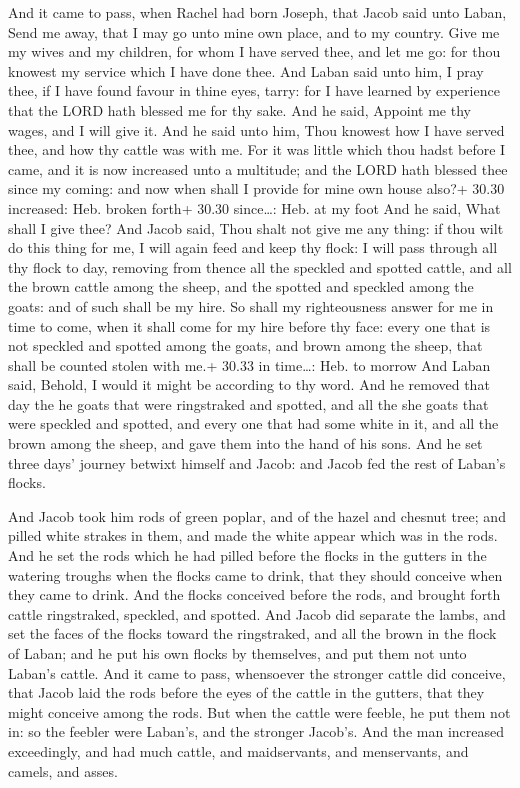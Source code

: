  And it came to pass, when Rachel had born Joseph, that
Jacob said unto Laban, Send me away, that I may go unto mine own place,
and to my country.  Give me my wives and my children, for
whom I have served thee, and let me go: for thou knowest my service
which I have done thee.  And Laban said unto him, I pray
thee, if I have found favour in thine eyes, tarry: for I have learned by
experience that the LORD hath blessed me for thy sake.  And
he said, Appoint me thy wages, and I will give it.  And he
said unto him, Thou knowest how I have served thee, and how thy cattle
was with me.  For it was little which thou hadst before I
came, and it is now increased unto a multitude; and the LORD hath
blessed thee since my coming: and now when shall I provide for mine own
house also?+ 30.30 increased: Heb. broken forth+ 30.30 since\ldots: Heb.
at my foot  And he said, What shall I give thee? And Jacob
said, Thou shalt not give me any thing: if thou wilt do this thing for
me, I will again feed and keep thy flock:  I will pass
through all thy flock to day, removing from thence all the speckled and
spotted cattle, and all the brown cattle among the sheep, and the
spotted and speckled among the goats: and of such shall be my hire.
 So shall my righteousness answer for me in time to come,
when it shall come for my hire before thy face: every one that is not
speckled and spotted among the goats, and brown among the sheep, that
shall be counted stolen with me.+ 30.33 in time\ldots: Heb. to morrow
 And Laban said, Behold, I would it might be according to
thy word.  And he removed that day the he goats that were
ringstraked and spotted, and all the she goats that were speckled and
spotted, and every one that had some white in it, and all the brown
among the sheep, and gave them into the hand of his sons. 
And he set three days' journey betwixt himself and Jacob: and Jacob fed
the rest of Laban's flocks.

 And Jacob took him rods of green poplar, and of the
hazel and chesnut tree; and pilled white strakes in them, and made the
white appear which was in the rods.  And he set the rods
which he had pilled before the flocks in the gutters in the watering
troughs when the flocks came to drink, that they should conceive when
they came to drink.  And the flocks conceived before the
rods, and brought forth cattle ringstraked, speckled, and spotted.
 And Jacob did separate the lambs, and set the faces of the
flocks toward the ringstraked, and all the brown in the flock of Laban;
and he put his own flocks by themselves, and put them not unto Laban's
cattle.  And it came to pass, whensoever the stronger
cattle did conceive, that Jacob laid the rods before the eyes of the
cattle in the gutters, that they might conceive among the rods.
 But when the cattle were feeble, he put them not in: so
the feebler were Laban's, and the stronger Jacob's.  And
the man increased exceedingly, and had much cattle, and maidservants,
and menservants, and camels, and asses.

